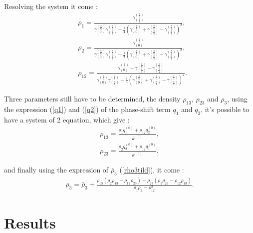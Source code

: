 \documentclass{article}
\begin{document}
    Resolving the system it come :
    \begin{align}
        &\rho_1=\frac{\gamma^{(\frac{\pi}{6})}_{(\frac{\pi}{2})}}{\gamma^{(\frac{\pi}{6})}_{(0)}\gamma^{(\frac{\pi}{6})}_{(\frac{\pi}{2})}-\frac{1}{4}(\gamma^{(\frac{\pi}{6})}_{(0)}+\gamma^{(\frac{\pi}{6})}_{(\frac{\pi}{2})}-\gamma^{(\frac{\pi}{4})}_{(\frac{\pi}{4})})^2},\label{rho1}\\
        &\rho_2=\frac{\gamma^{(\frac{\pi}{6})}_{(0)}}{\gamma^{(\frac{\pi}{6})}_{(0)}\gamma^{(\frac{\pi}{6})}_{(\frac{\pi}{2})}-\frac{1}{4}(\gamma^{(\frac{\pi}{6})}_{(0)}+\gamma^{(\frac{\pi}{6})}_{(\frac{\pi}{2})}-\gamma^{(\frac{\pi}{4})}_{(\frac{\pi}{4})})^2},\label{rho2}\\
        &\rho_{12}=\frac{\gamma^{(\frac{\pi}{6})}_{(0)}+\gamma^{(\frac{\pi}{6})}_{(\frac{\pi}{2})}-\gamma^{(\frac{\pi}{4})}_{(\frac{\pi}{4})}}{\gamma^{(\frac{\pi}{6})}_{(0)}\gamma^{(\frac{\pi}{6})}_{(\frac{\pi}{2})}-\frac{1}{4}(\gamma^{(\frac{\pi}{6})}_{(0)}+\gamma^{(\frac{\pi}{6})}_{(\frac{\pi}{2})}-\gamma^{(\frac{\pi}{4})}_{(\frac{\pi}{4})})^2}.\label{rho12}
    \end{align}
    
    Three parameters still have to be determined, the density $\rho_{13}$, $\rho_{23}$ and $\rho_3$, using the expression (\ref{q1}) and (\ref{q2}) of the phase-shift term $q_1$ and $q_2$, it's possible to have a system of 2 equation, which give :
    \begin{align}
    \rho_{13}=\frac{\rho_1q_1^{(0)}+\rho_{12}q_2^{(0)}}{k^{(0)}},\\
    \rho_{23}=\frac{\rho_2q_2^{(0)}+\rho_{12}q_1^{(0)}}{k^{(0)}}.
    \end{align}
    
    and finally using the expression of $\tilde{\rho_3}$ (\ref{rho3tild}), it come :
    \begin{align}
    \rho_3=\tilde{\rho_3}+\frac{\rho_{13}(\rho_2\rho_{13}-\rho_{12}\rho_{23})+\rho_{23}(\rho_1\rho_{23}-\rho_{12}\rho_{13})}{\rho_1\rho_2-\rho_{12}^2}.
    \end{align}

    
\section{Results}
\end{document}
